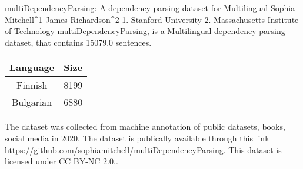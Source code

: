 
multiDependencyParsing: A dependency parsing dataset for Multilingual
Sophia Mitchell^1 James Richardson^2
1. Stanford University 2. Massachusetts Institute of Technology
multiDependencyParsing, is a Multilingual dependency parsing dataset, that contains 15079.0 sentences.

    \begin{table}[h]
    \centering
    \begin{tabular}{|c|c|}
    \hline
    Language & Size \\
    \hline
    Finnish & 8199 \\ 
Bulgarian & 6880 \\ 
 \hline
    \end{tabular}
    \end{table}
    
The dataset was collected from machine annotation of public datasets, books, social media in 2020. 
The dataset is publically available through this link https://github.com/sophiamitchell/multiDependencyParsing. This dataset is licensed under CC BY-NC 2.0..

